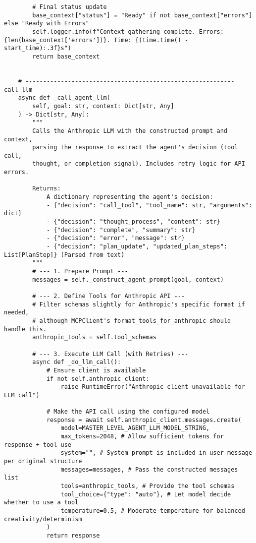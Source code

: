 \documentclass[12pt,a4paper]{article}
\begin{document}
\begin{pageablecode}
\begin{verbatim}
        # Final status update
        base_context["status"] = "Ready" if not base_context["errors"] else "Ready with Errors"
        self.logger.info(f"Context gathering complete. Errors: {len(base_context['errors'])}. Time: {(time.time() - start_time):.3f}s")
        return base_context


    # ----------------------------------------------------------- call‑llm --
    async def _call_agent_llm(
        self, goal: str, context: Dict[str, Any]
    ) -> Dict[str, Any]:
        """
        Calls the Anthropic LLM with the constructed prompt and context,
        parsing the response to extract the agent's decision (tool call,
        thought, or completion signal). Includes retry logic for API errors.

        Returns:
            A dictionary representing the agent's decision:
            - {"decision": "call_tool", "tool_name": str, "arguments": dict}
            - {"decision": "thought_process", "content": str}
            - {"decision": "complete", "summary": str}
            - {"decision": "error", "message": str}
            - {"decision": "plan_update", "updated_plan_steps": List[PlanStep]} (Parsed from text)
        """
        # --- 1. Prepare Prompt ---
        messages = self._construct_agent_prompt(goal, context)

        # --- 2. Define Tools for Anthropic API ---
        # Filter schemas slightly for Anthropic's specific format if needed,
        # although MCPClient's format_tools_for_anthropic should handle this.
        anthropic_tools = self.tool_schemas

        # --- 3. Execute LLM Call (with Retries) ---
        async def _do_llm_call():
            # Ensure client is available
            if not self.anthropic_client:
                raise RuntimeError("Anthropic client unavailable for LLM call")

            # Make the API call using the configured model
            response = await self.anthropic_client.messages.create(
                model=MASTER_LEVEL_AGENT_LLM_MODEL_STRING,
                max_tokens=2048, # Allow sufficient tokens for response + tool use
                system="", # System prompt is included in user message per original structure
                messages=messages, # Pass the constructed messages list
                tools=anthropic_tools, # Provide the tool schemas
                tool_choice={"type": "auto"}, # Let model decide whether to use a tool
                temperature=0.5, # Moderate temperature for balanced creativity/determinism
            )
            return response


\end{verbatim}
\end{pageablecode}
\end{document}
